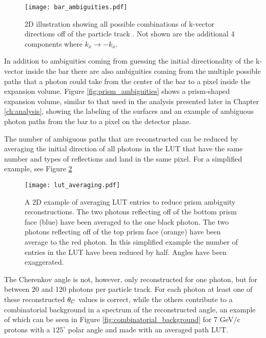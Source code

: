 \begin{figure}[!htb]
	\centering
	\texttt{[image: bar\_ambiguities.pdf]}
	\caption[2D illustration showing all possible combinations of k-vector directions off of the particle track.]{2D illustration showing all possible combinations of k-vector directions off of the particle track \cite{GregThesis}. Not shown are the additional 4 components where $k_x \rightarrow -k_x$.}
	\label{fig:bar_ambiguities}
\end{figure}

In addition to ambiguities coming from guessing the initial directionality of the k-vector inside the bar there are also ambiguities coming from the multiple possible paths that a photon could take from the center of the bar to a pixel inside the expansion volume. Figure \ref{fig:prism_ambiguities} shows a prism-shaped expansion volume, similar to that used in the analysis presented later in Chapter \ref{ch:analysis}, showing the labeling of the surfaces and an example of ambiguous photon paths from the bar to a pixel on the detector plane.

The number of ambiguous paths that are reconstructed can be reduced by averaging the initial direction of all photons in the LUT that have the same number and types of reflections and land in the same pixel. For a simplified example, see Figure \ref{fig:lut_averaging}

\begin{figure}[!htb]
	\centering
	\texttt{[image: lut\_averaging.pdf]}
	\caption[A 2D example of averaging LUT entries to reduce prism ambiguity reconstructions.]{A 2D example of averaging LUT entries to reduce prism ambiguity reconstructions. The two photons reflecting off of the bottom prism face (blue) have been averaged to the one black photon. The two photons reflecting off of the top prism face (orange) have been average to the red photon. In this simplified example the number of entries in the LUT have been reduced by half. Angles have been exaggerated.}
	\label{fig:lut_averaging}
\end{figure}

The Cherenkov angle is not, however, only reconstructed for one photon, but for between 20 and 120 photons per particle track. For each photon at least one of these reconstructed $\theta_{C}$ values is correct, while the others contribute to a combinatorial background in a spectrum of the reconstructed angle, an example of which can be seen in Figure \ref{fig:combinatorial_background} for 7 GeV/c protons with a $125^{\circ}$ polar angle and made with an averaged path LUT.

